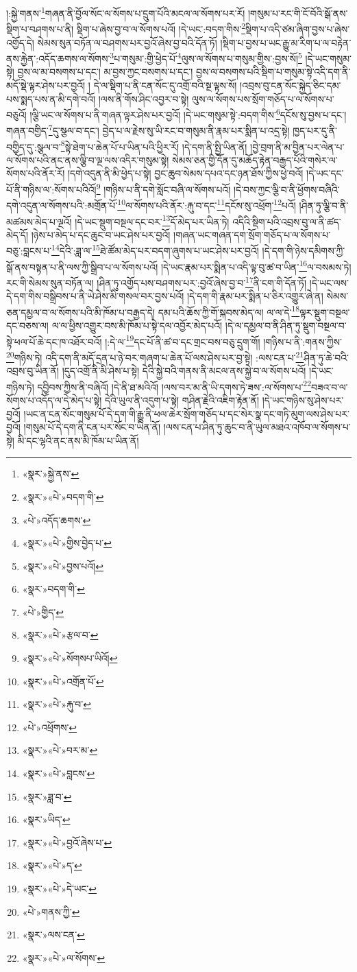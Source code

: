 །:སྐྱེ་གནས་\footnote{«སྣར་»སྐྱེ་ནས་}གཞན་ནི་བྱོལ་སོང་ལ་སོགས་པ་དྲུག་པོའི་མངལ་ལ་སོགས་པར་རོ། །གསུམ་པ་རང་གི་ངོ་བོའི་སྒོ་ནས་སྡིག་པ་བཤགས་པ་ནི། སྡིག་པ་ཞེས་བྱ་བ་ལ་སོགས་པའོ། །དེ་ཡང་:བདག་གིས་\footnote{«སྣར་»«པེ་»བདག་གི་}སྡིག་པ་འདི་ཙམ་ཞིག་བྱས་པ་ཞེས་འགྱོད་དེ། སེམས་སུན་བཏོན་ལ་བཤགས་པར་བྱའོ་ཞེས་བྱ་བའི་དོན་ཏོ། །སྡིག་པ་བྱས་པ་ཡང་རྒྱུ་མ་རིག་པ་ལ་བརྟེན་ནས་རྐྱེན་:འདོད་ཆགས་ལ་སོགས་\footnote{«པེ་»འདོད་ཆགས་}པ་གསུམ་:གྱི་ཕྱེད་པོ་\footnote{«སྣར་»«པེ་»གྱིས་བྱེད་པ་}ལུས་ལ་སོགས་པ་གསུམ་གྱིས་:བྱས་སོ།\footnote{«སྣར་»«པེ་»བྱས་པའོ།} །དེ་ཡང་གསུམ་སྟེ། བྱས་ལ་མ་བསགས་པ་དང་། མ་བྱས་ཀྱང་བསགས་པ་དང་། བྱས་ལ་བསགས་པའི་སྡིག་པ་གསུམ་སྟེ་འདི་དག་ནི་མདོ་སྡེ་ལྟར་ཤེས་པར་བྱའོ། །
དེ་ལ་སྡིག་པ་ནི་ངན་སོང་དུ་འགྲོ་བའི་སྔ་ལྟས་སོ། །འབྲས་བུ་ངན་སོང་སྐྱེད་ཅིང་དམ་པས་སྨད་པས་ན་མི་དགེ་བའོ། །ལས་ནི་གོས་ཤིང་འབྱར་བ་སྟེ། ལུས་ལ་སོགས་པས་སྲོག་གཅོད་པ་ལ་སོགས་པ་བཅུའོ། །ལྕི་ཡང་ལ་སོགས་པ་ནི་གཞན་ལྟར་ཤེས་པར་བྱའོ། །དེ་ཡང་གསུམ་སྟེ་:བདག་གིས་\footnote{«སྣར་»བདག་གི་}དངོས་སུ་བྱས་པ་དང་། གཞན་བགྱིད་\footnote{«པེ་»གྱིད་}དུ་སྩལ་བ་དང་། བྱེད་པ་ལ་རྗེས་སུ་ཡི་རང་བ་གསུམ་ནི་རྣམ་པར་སྨིན་པ་འདྲ་སྟེ། ཁྱད་པར་དུ་ནི་བགྱིད་དུ་:སྩལ་བ་\footnote{«སྣར་»«པེ་»རྩལ་བ་}སྟེ་ཐེག་པ་ཆེན་པོ་པ་ཡིན་པའི་ཕྱིར་རོ། །དེ་དག་ནི་སྤྱི་ཡིན་ནོ། །བྱེ་བྲག་ནི་མ་བྱིན་པར་ལེན་པ་ལ་སོགས་པའི་ནང་ནས་ལྕི་བ་ལྔ་ལས་འདིར་གསུམ་སྟེ། སེམས་ཅན་གྱི་དོན་དུ་མཆོད་རྟེན་བརྒྱད་པོའི་གསེར་ལ་སོགས་པའི་ནོར་རོ། །དགེ་འདུན་ནི་མི་ཕྱེད་པ་སྟེ། བྱང་ཆུབ་སེམས་དཔའ་དང་ཉན་ཐོས་ཀྱིས་ཕྱེ་བའོ། །དེ་ཡང་དང་པོ་ནི་གཉིས་ལ་:སོགས་པའིའོ།\footnote{«སྣར་»«པེ་»སོགསཔ་ཡིའོ།} །གཉིས་པ་ནི་དགེ་སློང་བཞི་ལ་སོགས་པའོ། །དེ་བས་ཀྱང་ལྕི་བ་ནི་ཕྱོགས་བཞིའི་དགེ་འདུན་ལ་སོགས་པའི་:མགྲོན་པོ་\footnote{«སྣར་»«པེ་»འགྲོན་པོ་}ལ་སོགས་པའི་ནོར་:རྐུ་བ་དང་\footnote{«སྣར་»«པེ་»རྐུ་བ་}དངོས་སུ་འཕྲོག་\footnote{«པེ་»འཕྲོགས་}པའོ། །ཤིན་ཏུ་ལྕི་བ་ནི་མཚམས་མེད་པ་ལྔའོ། །དེ་ཡང་སྡུག་བསྔལ་དང་བར་\footnote{«སྣར་»«པེ་»བར་མ་}དོ་མེད་པར་ཡིན་ཏེ། འདིའི་སྡིག་པའི་འབྲས་བུ་ལ་ནི་ཚད་མེད་དོ། །ཉེས་པ་མེད་པ་དང་ཆུང་བ་ཡང་ཤེས་པར་བྱའོ། །གཞན་ཡང་གཞན་དག་སྲོག་གཅོད་པ་ལ་སོགས་པ་བཅུ་:བླངས་པ་\footnote{«སྣར་»«པེ་»བླངས་}དེའི་:ཟླ་ལ་\footnote{«སྣར་»ཟླ་བ་}ཐེ་ཚོམ་མེད་པར་བདག་ཞུགས་པ་ཡང་ཤེས་པར་བྱའོ། །དེ་དག་གི་ཉེས་དམིགས་ཀྱི་སྒོ་ནས་བསྟན་པ་ནི་ལས་ཀྱི་སྒྲིབ་པ་ལ་སོགས་པའོ། །དེ་ཡང་རྣམ་པར་སྨིན་པ་འདི་ལྟ་བུ་ཚ་བ་ཡིན་\footnote{«སྣར་»ཡིད་}ལ་བསམས་ཏེ། རང་གི་སེམས་སུན་བཏོན་ལ། །ཤིན་ཏུ་འགྱོད་པས་བཤགས་པར་:བྱའོ་ཞེས་བྱ་བ་\footnote{«སྣར་»«པེ་»བྱའོ་ཞེས་པ་}ནི་ངག་གི་དོན་ཏོ། །དེ་ཡང་ལས་དེ་དག་གིས་བསྒྲིབས་པ་ནི་ཡེ་ཤེས་མི་གསལ་བར་བྱས་པའོ། །དེ་དག་གི་རྣམ་པར་སྨིན་པ་ཅིར་འགྱུར་ཞེ་ན། སེམས་ཅན་དམྱལ་བ་ལ་སོགས་པའི་མི་ཁོམ་པ་བརྒྱད་དེ། དམ་པའི་ཆོས་ཀྱི་གོ་སྐབས་མེད་ལ། ལ་ལ་དེ་\footnote{«སྣར་»«པེ་»ད་}ལྟར་སྡུག་བསྔལ་དང་བཅས་ལ། ལ་ལ་ཕྱིས་འགྱུར་བས་མི་ཁོམ་པ་སྟེ་དལ་འབྱོར་མེད་པའོ། །དེ་ལ་དམྱལ་བ་ནི་ཤིན་ཏུ་སྡུག་བསྔལ་བ་སྟེ་ཕལ་པོ་ཆེ་དང་ཁ་འཐོར་བའོ། །:དེ་ལ་\footnote{«སྣར་»«པེ་»དེ་ཡང་}དང་པོ་ནི་ཚ་བ་དང་གྲང་བས་བཅུ་དྲུག་གོ། །གཉིས་པ་ནི་:གནས་ཀྱིས་\footnote{«པེ་»གནས་ཀྱི་}གཉིས་ཏེ། འདི་དག་ནི་མདོ་དྲན་པ་ཉེ་བར་གཞག་པ་ཆེན་པོ་ལས་ཤེས་པར་བྱ་སྟེ། :ལས་ངན་པ་\footnote{«སྣར་»ལས་ངན་}ཤིན་ཏུ་ཆེ་བའི་འབྲས་བུ་ཡིན་ནོ། །དུད་འགྲོ་ནི་མི་ཤེས་པ་སྟེ། དེའི་སྐྱེ་བའི་གནས་ནི་མངལ་ནས་སྐྱེ་བ་ལ་སོགས་པའོ། །དེ་ཡང་གཉིས་ཏེ། དབྱིབས་ཀྱིས་ནི་བཞིའོ། །དེ་ནི་ཐ་མའིའོ། །ལས་བར་མ་ནི་ཡི་དགས་ཏེ་ཟས་:ལ་སོགས་པ་\footnote{«སྣར་»«པེ་»ལ་སོགས་}བཟའ་བ་ལ་སོགས་པ་འདོད་ལ་དེ་མེད་པ་སྟེ། དེའི་ཡུལ་ནི་འདུག་པ་སྟེ། གཤིན་རྗེའི་འཇིག་རྟེན་ནོ། །དེ་ཡང་གཉིས་སུ་ཤེས་པར་བྱའོ། །ཡང་ན་ངན་སོང་གསུམ་པོ་དེ་དག་གི་རྒྱུ་ནི་ཕལ་ཆེར་སྲོག་གཅོད་པ་དང་སེར་སྣ་དང་གཏི་མུག་ལས་ཤེས་པར་བྱའོ། །གསུམ་པོ་དེ་དག་ནི་ངན་པར་སོང་བ་ཡིན་ནོ། །ལས་ངན་པ་ཤིན་ཏུ་ཆུང་བ་ནི་ཡུལ་མཐའ་འཁོབ་ལ་སོགས་པ་སྟེ། མི་དང་ལྷའི་ནང་ནས་མི་ཁོམ་པ་ཡིན་ནོ། 